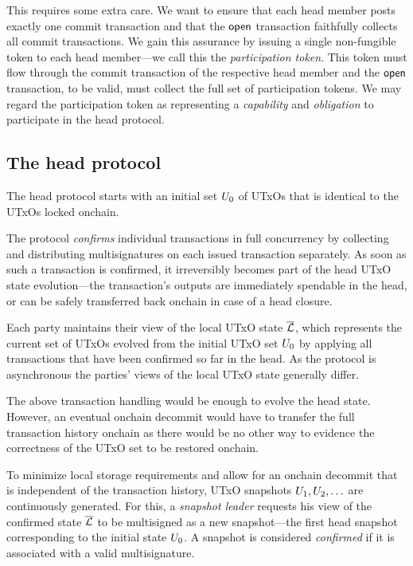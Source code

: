 This requires some extra care. We want to ensure that each
head member posts exactly one commit transaction and that the $\mathsf{open}$
transaction faithfully collects all commit
transactions. We gain this assurance by issuing a single non-fungible
token to each head member---we call this the \emph{participation
  token}.  This token must flow through the commit transaction of the
respective head member and the $\mathsf{open}$ transaction, to be valid, must
collect the full set of participation tokens. We may regard the
participation token as representing a \emph{capability} and
\emph{obligation} to participate in the head protocol.


\subsection{The head protocol}
\label{sec:overview_hp}

The head protocol starts with an initial set $U_{0}$ of UTxOs that
is identical to the UTxOs locked onchain.

The protocol \emph{confirms} individual transactions in full
concurrency by collecting and distributing multisignatures on each
issued transaction separately.
As soon as such a transaction is confirmed, it irreversibly becomes
part of the head UTxO state evolution---the transaction's outputs
are immediately spendable in the head, or can be safely transferred
back onchain in case of a head closure.

Each party maintains their view of the local UTxO state $\overline {\mathcal L}$, which
represents the current set of UTxOs evolved from the initial UTxO set
$U_{0}$ by applying all transactions that have been confirmed so far
in the head. As the protocol is asynchronous the parties' views
of the local UTxO state generally differ.

The above transaction handling would be enough to evolve the head state.
However, an eventual onchain decommit would have to transfer the
full transaction history onchain as there would be no other way
to evidence the correctness of the UTxO set to be restored onchain.

To minimize local storage requirements and allow for an
onchain decommit that is independent of the transaction
history, UTxO snapshots $U_1,U_2,\ldots$ are continuously
generated. For this, a \emph{snapshot leader} requests his
view of the confirmed state $\overline {\mathcal L}$ to be multisigned as a new
snapshot---the first head snapshot corresponding to the initial
state $U_{0}$. A snapshot is considered \emph{confirmed} if it
is associated with a valid multisignature.

